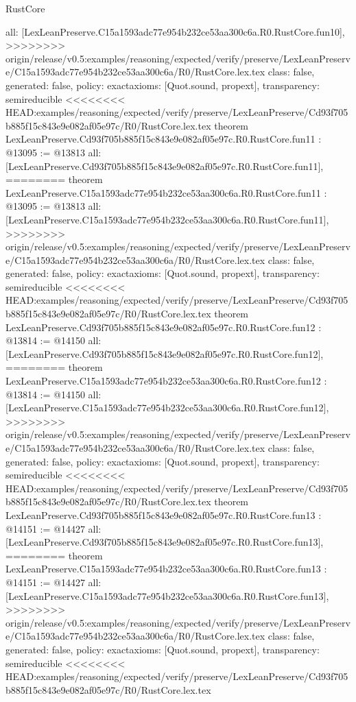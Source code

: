 \begin{lexlean}{RustCore}
\begin{coremodule}
{\begin{coremodule}
{{{{{{{{{{{{{{  all: [LexLeanPreserve.C15a1593adc77e954b232ce53aa300c6a.R0.RustCore.fun10],
>>>>>>>> origin/release/v0.5:examples/reasoning/expected/verify/preserve/LexLeanPreserve/C15a1593adc77e954b232ce53aa300c6a/R0/RustCore.lex.tex
  class: false,
  generated: false,
  policy: exact{axioms: [Quot.sound, propext]},
  transparency: semireducible
}
<<<<<<<< HEAD:examples/reasoning/expected/verify/preserve/LexLeanPreserve/Cd93f705b885f15c843e9e082af05e97c/R0/RustCore.lex.tex
theorem LexLeanPreserve.Cd93f705b885f15c843e9e082af05e97c.R0.RustCore.fun11 : @13095 := @13813 {
  all: [LexLeanPreserve.Cd93f705b885f15c843e9e082af05e97c.R0.RustCore.fun11],
========
theorem LexLeanPreserve.C15a1593adc77e954b232ce53aa300c6a.R0.RustCore.fun11 : @13095 := @13813 {
  all: [LexLeanPreserve.C15a1593adc77e954b232ce53aa300c6a.R0.RustCore.fun11],
>>>>>>>> origin/release/v0.5:examples/reasoning/expected/verify/preserve/LexLeanPreserve/C15a1593adc77e954b232ce53aa300c6a/R0/RustCore.lex.tex
  class: false,
  generated: false,
  policy: exact{axioms: [Quot.sound, propext]},
  transparency: semireducible
}
<<<<<<<< HEAD:examples/reasoning/expected/verify/preserve/LexLeanPreserve/Cd93f705b885f15c843e9e082af05e97c/R0/RustCore.lex.tex
theorem LexLeanPreserve.Cd93f705b885f15c843e9e082af05e97c.R0.RustCore.fun12 : @13814 := @14150 {
  all: [LexLeanPreserve.Cd93f705b885f15c843e9e082af05e97c.R0.RustCore.fun12],
========
theorem LexLeanPreserve.C15a1593adc77e954b232ce53aa300c6a.R0.RustCore.fun12 : @13814 := @14150 {
  all: [LexLeanPreserve.C15a1593adc77e954b232ce53aa300c6a.R0.RustCore.fun12],
>>>>>>>> origin/release/v0.5:examples/reasoning/expected/verify/preserve/LexLeanPreserve/C15a1593adc77e954b232ce53aa300c6a/R0/RustCore.lex.tex
  class: false,
  generated: false,
  policy: exact{axioms: [Quot.sound, propext]},
  transparency: semireducible
}
<<<<<<<< HEAD:examples/reasoning/expected/verify/preserve/LexLeanPreserve/Cd93f705b885f15c843e9e082af05e97c/R0/RustCore.lex.tex
theorem LexLeanPreserve.Cd93f705b885f15c843e9e082af05e97c.R0.RustCore.fun13 : @14151 := @14427 {
  all: [LexLeanPreserve.Cd93f705b885f15c843e9e082af05e97c.R0.RustCore.fun13],
========
theorem LexLeanPreserve.C15a1593adc77e954b232ce53aa300c6a.R0.RustCore.fun13 : @14151 := @14427 {
  all: [LexLeanPreserve.C15a1593adc77e954b232ce53aa300c6a.R0.RustCore.fun13],
>>>>>>>> origin/release/v0.5:examples/reasoning/expected/verify/preserve/LexLeanPreserve/C15a1593adc77e954b232ce53aa300c6a/R0/RustCore.lex.tex
  class: false,
  generated: false,
  policy: exact{axioms: [Quot.sound, propext]},
  transparency: semireducible
}
<<<<<<<< HEAD:examples/reasoning/expected/verify/preserve/LexLeanPreserve/Cd93f705b885f15c843e9e082af05e97c/R0/RustCore.lex.tex
}}}}}}}}}}}}}}}}
\end{coremodule}}
\end{coremodule}
\end{lexlean}
